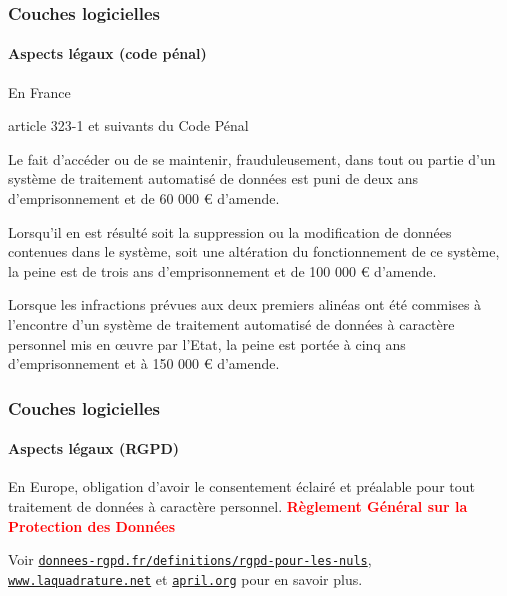 \documentclass[xcolor=svgnames,final,smaller,a4]{beamer}
\begin{document}
\begin{frame}
  \frametitle{Couches logicielles}
  \framesubtitle{Aspects légaux (code pénal)}

  En France

  
  \begin{block}{article 323-1 et suivants du Code Pénal}

    \begin{relsize}{-0.5}
Le fait d'accéder ou de se maintenir, frauduleusement, dans tout ou
partie d'un système de traitement automatisé de données est puni de
deux ans d'emprisonnement et de 60 000 € d'amende.

Lorsqu'il en est résulté soit la suppression ou la modification de
données contenues dans le système, soit une altération du
fonctionnement de ce système, la peine est de trois ans
d'emprisonnement et de 100 000 € d'amende.

Lorsque les infractions prévues aux deux premiers alinéas ont été
commises à l'encontre d'un système de traitement automatisé de données
à caractère personnel mis en œuvre par l'Etat, la peine est portée à
cinq ans d'emprisonnement et à 150 000 € d'amende.
    \end{relsize}
  \end{block}
\end{frame}



\begin{frame}
  \frametitle{Couches logicielles}
  \framesubtitle{Aspects légaux (RGPD)}

  En Europe, obligation d'avoir le consentement éclairé et préalable
  pour tout traitement de données à caractère
  personnel. \textbf{\textcolor{red}{Règlement Général sur la
      Protection des Données}}

  Voir
  \href{https://donnees-rgpd.fr/definitions/rgpd-pour-les-nuls/}{\texttt{donnees-rgpd.fr/definitions/rgpd-pour-les-nuls}}, \href{https://www.laquadrature.net}{\texttt{www.laquadrature.net}} et \href{https://april.org/}{\texttt{april.org}} 
  pour en savoir plus.
\end{frame}
\end{document}

